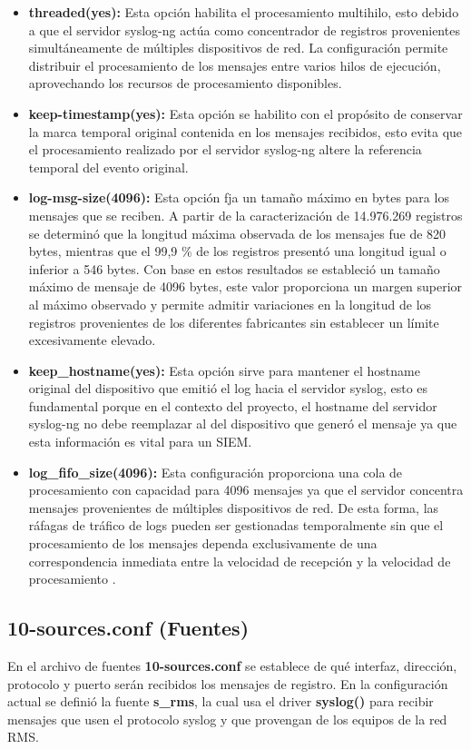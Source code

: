 \begin{itemize}
    \item \textbf{threaded(yes):} Esta opción habilita el procesamiento multihilo, esto debido a que el servidor syslog-ng actúa como concentrador de registros provenientes simultáneamente de múltiples dispositivos de red. La configuración permite distribuir el procesamiento de los mensajes entre varios hilos de ejecución, aprovechando los recursos de procesamiento disponibles.
    \item \textbf{keep-timestamp(yes):} Esta opción se habilito con el propósito de conservar la marca temporal original contenida en los mensajes recibidos, esto evita que el procesamiento realizado por el servidor syslog-ng altere la referencia temporal del evento original.
    \item \textbf{log-msg-size(4096):} Esta opción fja un tamaño máximo en bytes para los mensajes que se reciben.
    A partir de la caracterización de 14.976.269 registros se determinó que la longitud máxima observada de los mensajes fue de 820 bytes, mientras que el 99,9 \% de los registros presentó una longitud igual o inferior a 546 bytes. Con base en estos resultados se estableció un tamaño máximo de mensaje de 4096 bytes, este valor proporciona un margen superior al máximo observado y permite admitir variaciones en la longitud de los registros provenientes de los diferentes fabricantes sin establecer un límite excesivamente elevado.
    \item \textbf{keep\_hostname(yes):} Esta opción sirve para mantener el hostname original del dispositivo que emitió el log hacia el servidor syslog, esto es fundamental porque en el contexto del proyecto, el hostname del servidor syslog-ng no debe reemplazar al del dispositivo que generó el mensaje ya que esta información es vital para un SIEM.
    \item \textbf{log\_fifo\_size(4096):} Esta configuración proporciona una cola de procesamiento con capacidad para 4096 mensajes ya que el servidor concentra mensajes provenientes de múltiples dispositivos de red. De esta forma, las ráfagas de tráfico de logs pueden ser gestionadas temporalmente sin que el procesamiento de los mensajes dependa exclusivamente de una correspondencia inmediata entre la velocidad de recepción y la velocidad de procesamiento \cite{syslogng_global_options}.
\end{itemize}

\subsection{10-sources.conf (Fuentes)}
En el archivo de fuentes \textbf{10-sources.conf} se establece de qué interfaz, dirección, protocolo y puerto serán recibidos los mensajes de registro. En la configuración actual se definió la fuente \textbf{s\_rms}, la cual usa el driver \textbf{syslog()} para recibir mensajes que usen el protocolo syslog y que provengan de los equipos de la red RMS.

